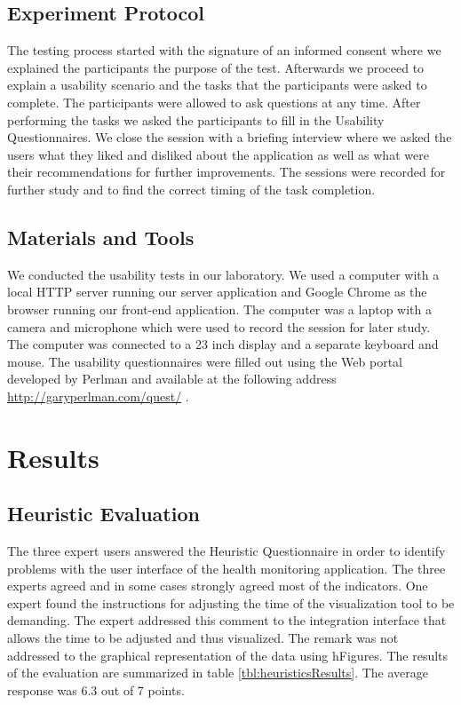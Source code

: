 \documentclass[twocolumn]{bmcart}%
\begin{document}
\subsection*{Experiment Protocol}


The testing process started with the signature of an informed consent where we explained the participants the purpose of the test. Afterwards we proceed to explain a usability scenario and the tasks that the participants were asked to complete. The participants were allowed to ask questions at any time. After performing the tasks we asked the participants to fill in the Usability Questionnaires. We close the session with a briefing interview where we asked the users what they liked and disliked about the application as well as what were their recommendations for further improvements. The sessions were recorded for further study and to find the correct timing of the task completion.

\subsection*{Materials and Tools} 

We conducted the usability tests in our laboratory. We used a computer with a local HTTP server running our server application and Google Chrome as the browser running our front-end application. The computer was a laptop with a camera and microphone which were used to record the session for later study. The computer was connected to a 23 inch display and a separate keyboard and mouse. The usability questionnaires were filled out using the Web portal developed by Perlman and available at the following address \url{http://garyperlman.com/quest/} .


\section*{Results}

\subsection*{Heuristic Evaluation}

The three expert users answered the Heuristic Questionnaire in order to identify problems with the user interface of the health monitoring application. The three experts agreed and in some cases strongly agreed most of the indicators. One expert found the instructions for adjusting the time of the visualization tool to be demanding. The expert addressed this comment to the integration interface that allows the time to be adjusted and thus visualized. The remark was not addressed to the graphical representation of the data using hFigures. The results of the evaluation are summarized in table \ref{tbl:heuristicsResults}. The average response was 6.3 out of 7 points.
\end{document}
